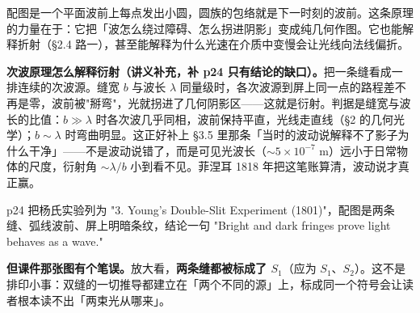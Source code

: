 \documentclass[11pt]{ctexart}
\newcommand{\cpage}[1]{\textsf{p#1}}
\begin{document}
配图是一个平面波前上每点发出小圆，圆族的包络就是下一时刻的波前。这条原理的力量在于：它把「波怎么绕过障碍、怎么拐进阴影」变成纯几何作图。它也能解释折射（§2.4 路一），甚至能解释为什么光速在介质中变慢会让光线向法线偏折。

\textbf{次波原理怎么解释衍射（讲义补充，补 \cpage{24} 只有结论的缺口）。}把一条缝看成一排连续的次波源。缝宽 $b$ 与波长 $\lambda$ 同量级时，各次波源到屏上同一点的路程差不再是零，波前被"掰弯"，光就拐进了几何阴影区——这就是衍射。判据是缝宽与波长的比值：$b\gg\lambda$ 时各次波几乎同相，波前保持平直，光线走直线（§2 的几何光学）；$b\sim\lambda$ 时弯曲明显。这正好补上 §3.5 里那条「当时的波动说解释不了影子为什么干净」——不是波动说错了，而是可见光波长（$\sim5\times10^{-7}$ m）远小于日常物体的尺度，衍射角 $\sim\lambda/b$ 小到看不见。菲涅耳 1818 年把这笔账算清，波动说才真正赢。



\cpage{24} 把杨氏实验列为 "3. Young's Double-Slit Experiment (1801)"，配图是两条缝、弧线波前、屏上明暗条纹，结论一句 "Bright and dark fringes prove light behaves as a wave."

\textbf{但课件那张图有个笔误。}放大看，\textbf{两条缝都被标成了 $S_1$}（应为 $S_1$、$S_2$）。这不是排印小事：双缝的一切推导都建立在「两个不同的源」上，标成同一个符号会让读者根本读不出「两束光从哪来」。
\end{document}
